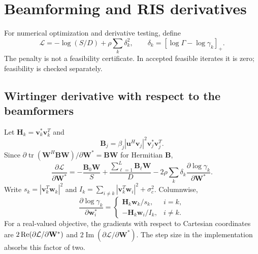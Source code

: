 \documentclass[11pt,a4paper]{article}
\begin{document}
\section{Beamforming and RIS derivatives}
For numerical optimization and derivative testing, define
\begin{equation}\label{eq:loss}
 \mathcal L=-\log(S/D)+\rho\sum_k\delta_k^2,\qquad
 \delta_k=[\log\Gamma-\log\gamma_k]_+.
\end{equation}
The penalty is not a feasibility certificate. In accepted feasible iterates it is zero; feasibility is checked separately.

\subsection{Wirtinger derivative with respect to the beamformers}
Let $\mathbf H_k=\mathbf v_k^*\mathbf v_k^T$ and
\begin{equation}
 \mathbf B_j=\beta_j|\mathbf u^H\mathbf v_j|^2\mathbf v_j^*\mathbf v_j^T.
\end{equation}
Since $\partial\operatorname{tr}(\mathbf W^H\mathbf B\mathbf W)/\partial\mathbf W^*=\mathbf B\mathbf W$ for Hermitian $\mathbf B$,
\begin{equation}\label{eq:gw}
 \frac{\partial\mathcal L}{\partial\mathbf W^*}
 =-\frac{\mathbf B_0\mathbf W}{S}
 +\frac{\sum_{\ell=1}^L\mathbf B_\ell\mathbf W}{D}
 -2\rho\sum_k\delta_k\frac{\partial\log\gamma_k}{\partial\mathbf W^*}.
\end{equation}
Write $s_k=|\mathbf v_k^T\mathbf w_k|^2$ and $I_k=\sum_{i\ne k}|\mathbf v_k^T\mathbf w_i|^2+\sigma_c^2$. Columnwise,
\begin{equation}\label{eq:gsinr}
 \frac{\partial\log\gamma_k}{\partial\mathbf w_i^*}=
 \begin{cases}\mathbf H_k\mathbf w_k/s_k,&i=k,\\-\mathbf H_k\mathbf w_i/I_k,&i\ne k.\end{cases}
\end{equation}
For a real-valued objective, the gradients with respect to Cartesian coordinates are $2\operatorname{Re}(\partial\mathcal L/\partial\mathbf W^*)$ and $2\operatorname{Im}(\partial\mathcal L/\partial\mathbf W^*)$. The step size in the implementation absorbs this factor of two.
\end{document}

